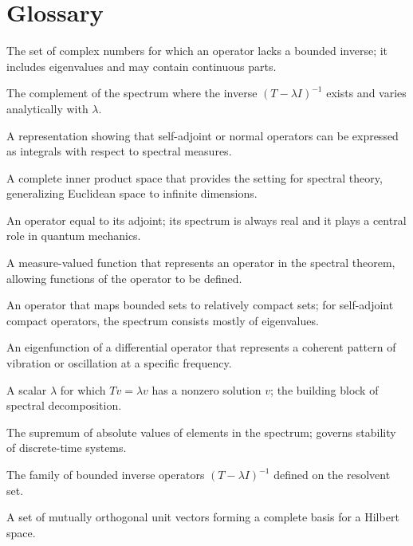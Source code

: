 \section*{Glossary}
\begin{description}[leftmargin=*,style=nextline,itemsep=0.3em]
\item[\textbf{Spectrum.}] The set of complex numbers for which an operator lacks a bounded inverse; it includes eigenvalues and may contain continuous parts.
\item[\textbf{Resolvent set.}] The complement of the spectrum where the inverse $(T-\lambda I)^{-1}$ exists and varies analytically with $\lambda$.
\item[\textbf{Spectral theorem.}] A representation showing that self-adjoint or normal operators can be expressed as integrals with respect to spectral measures.
\item[\textbf{Hilbert space.}] A complete inner product space that provides the setting for spectral theory, generalizing Euclidean space to infinite dimensions.
\item[\textbf{Self-adjoint operator.}] An operator equal to its adjoint; its spectrum is always real and it plays a central role in quantum mechanics.
\item[\textbf{Spectral measure.}] A measure-valued function that represents an operator in the spectral theorem, allowing functions of the operator to be defined.
\item[\textbf{Compact operator.}] An operator that maps bounded sets to relatively compact sets; for self-adjoint compact operators, the spectrum consists mostly of eigenvalues.
\item[\textbf{Normal mode.}] An eigenfunction of a differential operator that represents a coherent pattern of vibration or oscillation at a specific frequency.
\item[\textbf{Eigenvalue.}] A scalar $\lambda$ for which $Tv=\lambda v$ has a nonzero solution $v$; the building block of spectral decomposition.
\item[\textbf{Spectral radius.}] The supremum of absolute values of elements in the spectrum; governs stability of discrete-time systems.
\item[\textbf{Resolvent.}] The family of bounded inverse operators $(T-\lambda I)^{-1}$ defined on the resolvent set.
\item[\textbf{Orthonormal basis.}] A set of mutually orthogonal unit vectors forming a complete basis for a Hilbert space.
\end{description}
